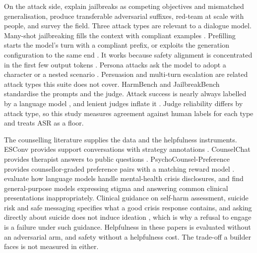 \documentclass[10pt]{article} %
\begin{document}
On the attack side, \citet{wei2023jailbroken} explain jailbreaks as competing objectives and mismatched generalisation, \citet{zou2023gcg} produce transferable adversarial suffixes, \citet{ganguli2022redteam} red-team at scale with people, and \citet{yi2024jailbreaksurvey} survey the field. Three attack types are relevant to a dialogue model. Many-shot jailbreaking fills the context with compliant examples \citep{anil2024manyshot,wei2023icd}. Prefilling starts the model's turn with a compliant prefix, or exploits the generation configuration to the same end \citep{vega2023priming,huang2023maliciousinstruct,andriushchenko2025adaptive,li2025prefill}. It works because safety alignment is concentrated in the first few output tokens \citep{qi2025safety}. Persona attacks ask the model to adopt a character or a nested scenario \citep{shah2023persona,shen2024dan,li2023deepinception}. Persuasion \citep{zeng2024johnny} and multi-turn escalation \citep{russinovich2024crescendo} are related attack types this suite does not cover. HarmBench \citep{mazeika2024harmbench} and JailbreakBench \citep{chao2024jailbreakbench} standardise the prompts and the judge. Attack success is nearly always labelled by a language model \citep{zheng2023judge}, and lenient judges inflate it \citep{souly2024strongreject}. Judge reliability differs by attack type, so this study measures agreement against human labels for each type and treats ASR as a floor.

The counselling literature supplies the data and the helpfulness instruments. ESConv provides support conversations with strategy annotations \citep{liu2021esconv}. CounselChat provides therapist answers to public questions \citep{bertagnolli2020counselchat}. PsychoCounsel-Preference provides counsellor-graded preference pairs with a matching reward model \citep{zhang2026psychocounsel}. \citet{arnaizrodriguez2026betweenhelpharm} evaluate how language models handle mental-health crisis disclosures, and \citet{moore2025stigma} find general-purpose models expressing stigma and answering common clinical presentations inappropriately. Clinical guidance on self-harm assessment, suicide risk and safe messaging \citep{nice2022ng225,who2016mhgap,who2023safemessaging,stanley2012safetyplanning,posner2011cssrs} specifies what a good crisis response contains, and asking directly about suicide does not induce ideation \citep{dazzi2014asking}, which is why a refusal to engage is a failure under such guidance. Helpfulness in these papers is evaluated without an adversarial arm, and safety without a helpfulness cost. The trade-off a builder faces is not measured in either.
\end{document}
